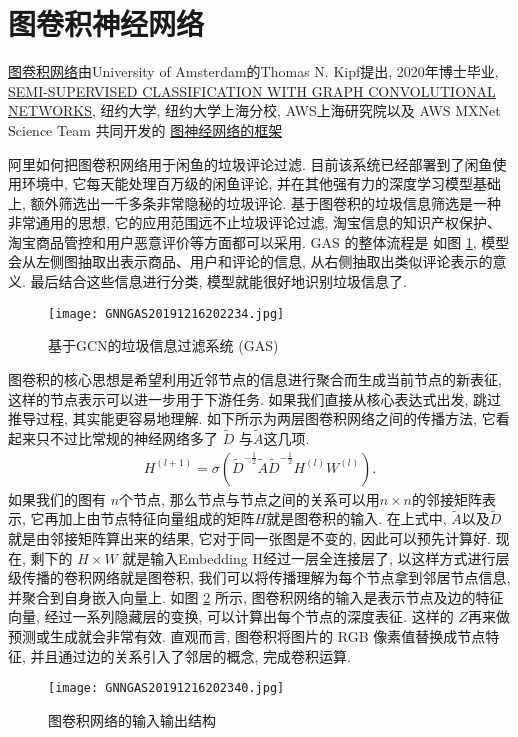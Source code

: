 \section{图卷积神经网络}
\href{https://github.com/zggl/planetoid}{图卷积网络}由University of Amsterdam的Thomas N. Kipf提出, 2020年博士毕业, \href{https://arxiv.org/abs/1609.02907}{SEMI-SUPERVISED CLASSIFICATION WITH
GRAPH CONVOLUTIONAL NETWORKS}, 纽约大学, 纽约大学上海分校, AWS上海研究院以及 AWS MXNet Science Team 共同开发的 \href{https://www.dgl.ai/}{图神经网络的框架}

阿里如何把图卷积网络用于闲鱼的垃圾评论过滤. 目前该系统已经部署到了闲鱼使用环境中, 它每天能处理百万级的闲鱼评论, 并在其他强有力的深度学习模型基础上, 额外筛选出一千多条非常隐秘的垃圾评论.
基于图卷积的垃圾信息筛选是一种非常通用的思想, 它的应用范围远不止垃圾评论过滤, 淘宝信息的知识产权保护、淘宝商品管控和用户恶意评价等方面都可以采用.
GAS 的整体流程是 如图 \ref{GNNGAS20191216202234}, 模型会从左侧图抽取出表示商品、用户和评论的信息, 从右侧抽取出类似评论表示的意义. 最后结合这些信息进行分类, 模型就能很好地识别垃圾信息了.
\begin{figure}[H]
    \centering
    \texttt{[image: GNNGAS20191216202234.jpg]}
    \caption{基于GCN的垃圾信息过滤系统 (GAS)}
    \label{GNNGAS20191216202234}
    \vspace{-0.4cm}
\end{figure}
图卷积的核心思想是希望利用近邻节点的信息进行聚合而生成当前节点的新表征, 这样的节点表示可以进一步用于下游任务.
如果我们直接从核心表达式出发, 跳过推导过程, 其实能更容易地理解. 如下所示为两层图卷积网络之间的传播方法, 它看起来只不过比常规的神经网络多了 $\tilde D$ 与$\tilde A$这几项.
\begin{align}
    H^{ (l+1)}=\sigma\left (\tilde{D}^{-\frac{1}{2}} \tilde{A} \tilde{D}^{-\frac{1}{2}} H^{ (l)} W^{ (l)}\right).
\end{align}
如果我们的图有 $n $个节点, 那么节点与节点之间的关系可以用$n\times n$的邻接矩阵表示, 它再加上由节点特征向量组成的矩阵$H$就是图卷积的输入.
在上式中, $\tilde A$以及$\tilde D$就是由邻接矩阵算出来的结果, 它对于同一张图是不变的, 因此可以预先计算好.
现在, 剩下的 $H\times W$ 就是输入Embedding H经过一层全连接层了, 以这样方式进行层级传播的卷积网络就是图卷积, 我们可以将传播理解为每个节点拿到邻居节点信息, 并聚合到自身嵌入向量上.
如图 \ref{GNNGAS20191216202340} 所示, 图卷积网络的输入是表示节点及边的特征向量, 经过一系列隐藏层的变换, 可以计算出每个节点的深度表征.
这样的 $Z$再来做预测或生成就会非常有效. 直观而言, 图卷积将图片的 RGB 像素值替换成节点特征, 并且通过边的关系引入了邻居的概念, 完成卷积运算.
\begin{figure}[H]
    \centering
    \texttt{[image: GNNGAS20191216202340.jpg]}
    \caption{图卷积网络的输入输出结构}
    \label{GNNGAS20191216202340}
    \vspace{-0.4cm}
\end{figure}

